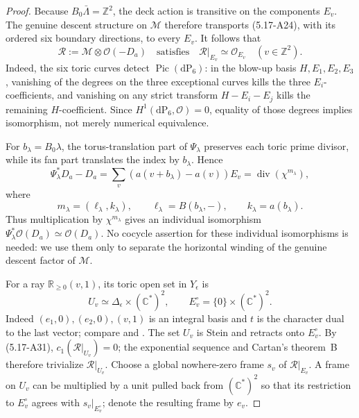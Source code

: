 \begin{proof}
Because \(B_0\bar\Lambda=\mathbb Z^2\), the deck action is transitive on
the components \(E_v\).  The genuine descent structure on \(\mathcal M\)
therefore transports (5.17-A24), with its ordered six boundary directions,
to every \(E_v\).  It follows that
\[
 \mathcal R:=\mathcal M\otimes\mathcal O(-D_a)
 \quad\text{satisfies}\quad
 \mathcal R|_{E_v}\simeq\mathcal O_{E_v}
 \quad(v\in\mathbb Z^2).
\tag{5.17-A31}
\]
Indeed, the six toric curves detect \(\operatorname{Pic}(\mathrm{dP}_6)\):
in the blow-up basis \(H,E_1,E_2,E_3\), vanishing of the degrees on the
three exceptional curves kills the three \(E_i\)-coefficients, and
vanishing on any strict transform \(H-E_i-E_j\) kills the remaining
\(H\)-coefficient.  Since
\(H^1(\mathrm{dP}_6,\mathcal O)=0\), equality of those degrees implies
isomorphism, not merely numerical equivalence.

For \(b_\lambda=B_0\lambda\), the torus-translation part of
\(\Psi_\lambda\) preserves each toric prime divisor, while its fan part
translates the index by \(b_\lambda\).  Hence
\[
 \Psi_\lambda^*D_a-D_a
 =\sum_v(a(v+b_\lambda)-a(v))E_v
 =\operatorname{div}(\chi^{m_\lambda}),
\tag{5.17-A32}
\]
where
\[
 m_\lambda=(\ell_\lambda,k_\lambda),
 \qquad
 \ell_\lambda=B(b_\lambda,-),
 \qquad
 k_\lambda=a(b_\lambda).
\tag{5.17-A33}
\]
Thus multiplication by \(\chi^{m_\lambda}\) gives an individual
isomorphism
\(\Psi_\lambda^*\mathcal O(D_a)\simeq\mathcal O(D_a)\).
No cocycle assertion for these individual isomorphisms is needed: we use
them only to separate the horizontal winding of the genuine descent factor
of \(\mathcal M\).

For a ray \(\mathbb R_{\ge0}(v,1)\), its toric open set in
\(Y_\epsilon\) is
\[
 U_v\simeq\Delta_\epsilon\times(\mathbb C^*)^2,
 \qquad E_v^\circ=\{0\}\times(\mathbb C^*)^2.
\tag{5.17-A34}
\]
Indeed \((e_1,0),(e_2,0),(v,1)\) is an integral basis and \(t\) is the
character dual to the last vector; compare
\cite[\S2.1, pp.~28--29]{Fulton1993} and
\cite[Example~1.2.21, p.~31]{CoxLittleSchenck2011}.
The set \(U_v\) is Stein and retracts
onto \(E_v^\circ\).  By (5.17-A31),
\(c_1(\mathcal R|_{U_v})=0\); the exponential sequence and Cartan's
theorem~B therefore trivialize \(\mathcal R|_{U_v}\).  Choose a global
nowhere-zero frame \(s_v\) of \(\mathcal R|_{E_v}\).  A frame on \(U_v\) can be
multiplied by a unit pulled back from \((\mathbb C^*)^2\) so that its
restriction to \(E_v^\circ\) agrees with \(s_v|_{E_v^\circ}\); denote the
resulting frame by \(e_v\).


\end{proof}
